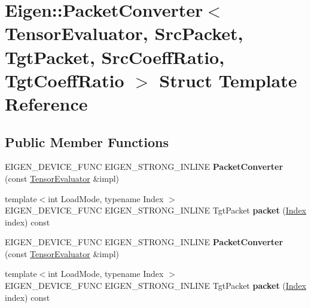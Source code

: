 \hypertarget{struct_eigen_1_1_packet_converter}{}\section{Eigen\+:\+:Packet\+Converter$<$ Tensor\+Evaluator, Src\+Packet, Tgt\+Packet, Src\+Coeff\+Ratio, Tgt\+Coeff\+Ratio $>$ Struct Template Reference}
\label{struct_eigen_1_1_packet_converter}
\subsection*{Public Member Functions}
\begin{DoxyCompactItemize}
\item 
\mbox{\label{struct_eigen_1_1_packet_converter_a9d3876c438acf82a6578730ab60c7b10}} 
E\+I\+G\+E\+N\+\_\+\+D\+E\+V\+I\+C\+E\+\_\+\+F\+U\+NC E\+I\+G\+E\+N\+\_\+\+S\+T\+R\+O\+N\+G\+\_\+\+I\+N\+L\+I\+NE {\bfseries Packet\+Converter} (const \hyperlink{struct_eigen_1_1_tensor_evaluator}{Tensor\+Evaluator} \&impl)
\item 
\mbox{\label{struct_eigen_1_1_packet_converter_a35a385665f28bdb237510dea85dbfb82}} 
{\footnotesize template$<$int Load\+Mode, typename Index $>$ }\\E\+I\+G\+E\+N\+\_\+\+D\+E\+V\+I\+C\+E\+\_\+\+F\+U\+NC E\+I\+G\+E\+N\+\_\+\+S\+T\+R\+O\+N\+G\+\_\+\+I\+N\+L\+I\+NE Tgt\+Packet {\bfseries packet} (\hyperlink{namespace_eigen_a62e77e0933482dafde8fe197d9a2cfde}{Index} index) const
\item 
\mbox{\label{struct_eigen_1_1_packet_converter_a9d3876c438acf82a6578730ab60c7b10}} 
E\+I\+G\+E\+N\+\_\+\+D\+E\+V\+I\+C\+E\+\_\+\+F\+U\+NC E\+I\+G\+E\+N\+\_\+\+S\+T\+R\+O\+N\+G\+\_\+\+I\+N\+L\+I\+NE {\bfseries Packet\+Converter} (const \hyperlink{struct_eigen_1_1_tensor_evaluator}{Tensor\+Evaluator} \&impl)
\item 
\mbox{\label{struct_eigen_1_1_packet_converter_a35a385665f28bdb237510dea85dbfb82}} 
{\footnotesize template$<$int Load\+Mode, typename Index $>$ }\\E\+I\+G\+E\+N\+\_\+\+D\+E\+V\+I\+C\+E\+\_\+\+F\+U\+NC E\+I\+G\+E\+N\+\_\+\+S\+T\+R\+O\+N\+G\+\_\+\+I\+N\+L\+I\+NE Tgt\+Packet {\bfseries packet} (\hyperlink{namespace_eigen_a62e77e0933482dafde8fe197d9a2cfde}{Index} index) const
\end{DoxyCompactItemize}



